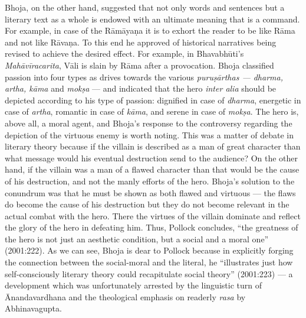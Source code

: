 Bhoja, on the other hand, suggested that not only words and sentences but a literary text as a whole is endowed with an ultimate meaning that is a command. For example, in case of the Rāmāyaṇa it is to exhort the reader to be like Rāma and not like Rāvaṇa. To this end he approved of historical narratives being revised to achieve the desired effect. For example, in Bhavabhūti's \textsl{Mahāvīracarita}, Vāli is slain by Rāma after a provocation. Bhoja classified passion into four types as drives towards the various \textsl{puruṣārthas --- dharma, artha, kāma} and \textsl{mokṣa} --- and indicated that the hero \textsl{inter alia} should be depicted according to his type of passion: dignified in case of \textsl{dharma}, energetic in case of \textsl{artha}, romantic in case of \textsl{kāma}, and serene in case of \textsl{mokṣa}. The hero is, above all, a moral agent, and Bhoja's response to the controversy regarding the depiction of the virtuous enemy is worth noting. This was a matter of debate in literary theory because if the villain is described as a man of great character than what message would his eventual destruction send to the audience? On the other hand, if the villain was a man of a flawed character than that would be the cause of his destruction, and not the manly efforts of the hero. Bhoja's solution to the conundrum was that he must be shown as both flawed and virtuous --- the flaws do become the cause of his destruction but they do not become relevant in the actual combat with the hero. There the virtues of the villain dominate and reflect the glory of the hero in defeating him. Thus, Pollock concludes, ``the greatness of the hero is not just an aesthetic condition, but a social and a moral one'' (2001:222). As we can see, Bhoja is dear to Pollock because in explicitly forging the connection between the social-moral and the literal, he ``illustrates just how self-consciously literary theory could recapitulate social theory'' (2001:223) --- a development which was unfortunately arrested by the linguistic turn of Ānandavardhana and the theological emphasis on readerly \textsl{rasa} by Abhinavagupta.

